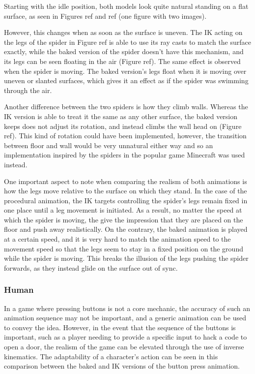 Starting with the idle position, both models look quite natural standing on
a flat surface, as seen in Figures ref and ref (one figure with two images).

However, this changes when as soon as the surface is uneven. The IK acting on
the legs of the spider in Figure ref is able to use its ray casts to match the
surface exactly, while the baked version of the spider doesn't have this
mechanism, and its legs can be seen floating in the air (Figure ref). The same
effect is observed when the spider is moving. The baked version's legs float
when it is moving over uneven or slanted surfaces, which gives it an effect as
if the spider was swimming through the air. 

Another difference between the two spiders is how they climb walls. Whereas the
IK version is able to treat it the same as any other surface, the baked version
keeps does not adjust its rotation, and instead climbs the wall head on (Figure
ref). This kind of rotation could have been implemented, however, the transition
between floor and wall would be very unnatural either way and so an
implementation inspired by the spiders in the popular game Minecraft was used
instead.

One important aspect to note when comparing the realism of both animations is
how the legs move relative to the surface on which they stand. In the case of
the procedural animation, the IK targets controlling the spider's legs remain
fixed in one place until a leg movement is initiated. As a result, no matter the
speed at which the spider is moving, the give the impression that they are
placed on the floor and push away realistically. On the contrary, the baked
animation is played at a certain speed, and it is very hard to match the
animation speed to the movement speed so that the legs seem to stay in a fixed
position on the ground while the spider is moving. This breaks the illusion of
the legs pushing the spider forwards, as they instead glide on the surface out
of sync.

\subsubsection{Human}
In a game where pressing buttons is not a core mechanic, the accuracy of such an
animation sequence may not be important, and a generic animation can be used to
convey the idea. However, in the event that the sequence of the buttons is
important, such as a player needing to provide a specific input to hack a code
to open a door, the realism of the game can be elevated through the use of
inverse kinematics. The adaptability of a character's action can be seen in this
comparison between the baked and IK versions of the button press animation.

